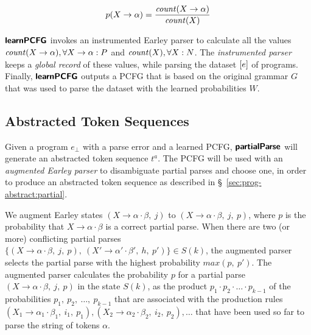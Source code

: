 \begin{equation*}
    p(X \rightarrow \alpha) = \frac{\mathit{count}(X \rightarrow \alpha)}{\mathit{count}(X)}
\end{equation*}



$\bm{\mathsf{learnPCFG}}$ invokes an instrumented Earley parser to calculate all the
values $\mathit{count}(X \rightarrow \alpha), \forall X \rightarrow \alpha: P$ and
$\mathit{count}(X), \forall X: N$. The \emph{instrumented parser} keeps a \emph{global record}
of these values, while parsing the dataset $[e]$ of programs.
%
Finally, $\bm{\mathsf{learnPCFG}}$ outputs a PCFG that is based on the original grammar
$G$ that was used to parse the dataset with the learned probabilities $W$.

\subsection{Abstracted Token Sequences}

Given a program $e_{\bot}$ with a parse error and a learned PCFG, $\bm{\mathsf{partialParse}}$
will generate an abstracted token sequence $t^a$. The PCFG will be used with an
\emph{augmented Earley parser} to disambiguate partial parses and choose one, in
order to produce an abstracted token sequence as described in
\S~\ref{sec:prog-abstract:partial}.

%
We augment Earley states $(X \rightarrow \alpha \cdot \beta,\ j)$ to
$(X \rightarrow \alpha \cdot \beta,\ j,\ p)$, where $p$ is the probability that $X
\rightarrow \alpha \cdot \beta$ is a correct partial parse.
%
When there are two (or more) conflicting partial parses
$\{(X \rightarrow \alpha \cdot \beta,\ j,\ p),\ (X' \rightarrow \alpha' \cdot \beta',\ h,\ p')\} \in S(k)$,
the augmented parser selects the partial parse with the highest probability $max(p,\ p')$.
%
The augmented parser calculates the probability $p$ for a partial parse
$(X \rightarrow \alpha \cdot \beta,\ j,\ p)$ in the state $S(k)$, as the
product $p_1 \cdot p_2 \cdot \dots \cdot p_{k-1}$ of the probabilities
$p_1,\ p_2,\ \dots,\ p_{k-1}$ that are associated with the production
rules $(X_1 \rightarrow \alpha_1 \cdot \beta_1,\ i_1,\ p_1),
(X_2 \rightarrow \alpha_2 \cdot \beta_2,\ i_2,\ p_2), \dots$
that have been used so far to parse the string of tokens $\alpha$.